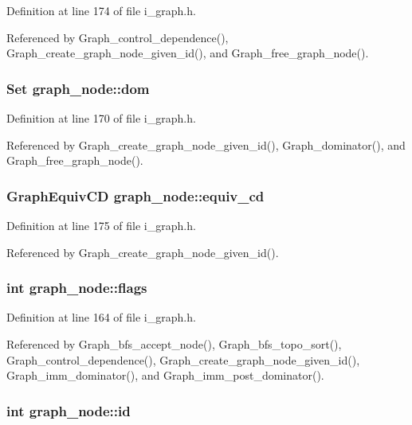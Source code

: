Definition at line 174 of file i\_\-graph.h.

Referenced by Graph\_\-control\_\-dependence(), Graph\_\-create\_\-graph\_\-node\_\-given\_\-id(), and Graph\_\-free\_\-graph\_\-node().
\subsubsection{\setlength{\rightskip}{0pt plus 5cm}\bf{Set} \bf{graph\_\-node::dom}}\label{structgraph__node_24b1a6a62ce9fc08476c6098b0abc960}




Definition at line 170 of file i\_\-graph.h.

Referenced by Graph\_\-create\_\-graph\_\-node\_\-given\_\-id(), Graph\_\-dominator(), and Graph\_\-free\_\-graph\_\-node().
\subsubsection{\setlength{\rightskip}{0pt plus 5cm}\bf{Graph\-Equiv\-CD} \bf{graph\_\-node::equiv\_\-cd}}\label{structgraph__node_7784f9ecd0b0bb6ba05f5379f10bf1a7}




Definition at line 175 of file i\_\-graph.h.

Referenced by Graph\_\-create\_\-graph\_\-node\_\-given\_\-id().
\subsubsection{\setlength{\rightskip}{0pt plus 5cm}int \bf{graph\_\-node::flags}}\label{structgraph__node_c0eb80c7c91966f05768eb2e11a4d679}




Definition at line 164 of file i\_\-graph.h.

Referenced by Graph\_\-bfs\_\-accept\_\-node(), Graph\_\-bfs\_\-topo\_\-sort(), Graph\_\-control\_\-dependence(), Graph\_\-create\_\-graph\_\-node\_\-given\_\-id(), Graph\_\-imm\_\-dominator(), and Graph\_\-imm\_\-post\_\-dominator().
\subsubsection{\setlength{\rightskip}{0pt plus 5cm}int \bf{graph\_\-node::id}}\label{structgraph__node_68ce85105167ebdcc2386fe9c8b8f29d}




